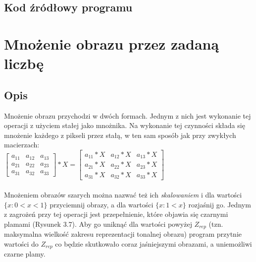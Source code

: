 \documentclass[a4paper,12pt]{book}
\begin{document}
\subsection{Kod źródłowy programu}

\section{Mnożenie obrazu przez zadaną liczbę}
\subsection{Opis}
Mnożenie obrazu przychodzi w dwóch formach. Jednym z nich jest wykonanie tej operacji z użyciem stałej jako mnożnika. Na wykonanie tej czynności składa się mnożenie każdego z pikseli przez stałą, w ten sam sposób jak przy zwykłych macierzach: \\
$
\begin{bmatrix}
a_{11} & a_{12} & a_{13}\\
a_{21} & a_{22} & a_{23}\\
a_{31} & a_{32} & a_{33}
\end{bmatrix}
* X = 
\begin{bmatrix}
a_{11} * X & a_{12} * X & a_{13} * X\\
a_{21} * X & a_{22} * X & a_{23} * X\\
a_{31} * X & a_{32} * X & a_{33} * X
\end{bmatrix}
$
\\\\
Mnożeniem obrazów szarych można nazwać też ich \textit{skalowaniem} i dla wartości $\{x: 0 < x < 1\}$ przyciemnij obrazy, a dla wartości $\{x: 1 < x\}$ rozjaśnij go. 
Jednym z zagrożeń przy tej operacji jest przepełnienie, które objawia się czarnymi plamami (Rysunek 3.7). Aby go uniknąć dla wartości powyżej  $Z_{rep}$ (tzn. maksymalna wielkość zakresu reprezentacji tonalnej obrazu) program przytnie wartości do $Z_{rep}$ co będzie skutkowało coraz jaśniejszymi obrazami, a uniemożliwi czarne plamy. 
\end{document}
